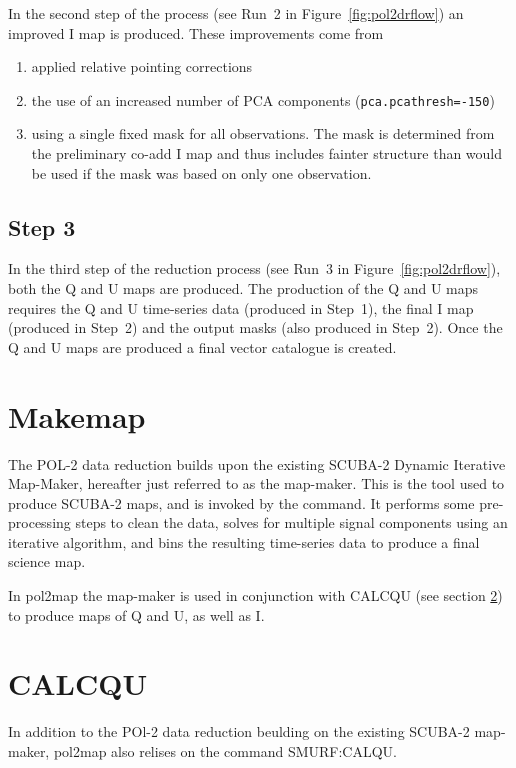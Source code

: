 In the second step of the process (see Run~2 in
Figure~\ref{fig:pol2drflow}) an improved I map is produced. These
improvements come from
\begin{enumerate}
\item applied relative pointing corrections
\item the use of an increased number of PCA components
  (\texttt{pca.pcathresh=-150})
\item using a single fixed mask for all observations. The mask is
  determined from the preliminary co-add I map and thus includes
  fainter structure than would be used if the mask was based on only
  one observation.
\end{enumerate}

\subsection*{Step 3}

In the third step of the reduction process (see Run~3 in
Figure~\ref{fig:pol2drflow}), both the Q and U maps are produced. The production
of the Q and U maps requires the Q and U time-series data (produced in
Step~1), the final I map (produced in Step~2) and the output masks (also
produced in Step~2). Once the Q and U maps are produced a final vector
catalogue is created.

\section{Makemap}

The POL-2 data reduction builds upon the existing SCUBA-2 Dynamic
Iterative Map-Maker, hereafter just referred to as the map-maker. This
is the tool used to produce SCUBA-2 maps, and is invoked by the
 command. It performs some
pre-processing steps to clean the data, solves for multiple signal
components using an iterative algorithm, and bins the resulting
time-series data to produce a final science map.

In pol2map the map-maker is used in conjunction with CALCQU (see
section \ref{sec:calcqu}) to produce maps of Q and U, as well as I.

\section{CALCQU}
\label{sec:calcqu}

In addition to the POl-2 data reduction beulding on the
existing SCUBA-2 map-maker, pol2map also relises on the command
SMURF:CALQU.

